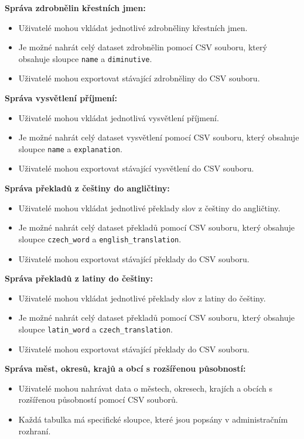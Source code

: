 \documentclass[czech, ba, kiv, he]{fasthesis}
\begin{document}
\textbf{Správa zdrobnělin křestních jmen:}
\begin{itemize}
    \item Uživatelé mohou vkládat jednotlivé zdrobněliny křestních jmen.
    \item Je možné nahrát celý dataset zdrobnělin pomocí CSV souboru, který obsahuje sloupce \texttt{name} a \texttt{diminutive}.
    \item Uživatelé mohou exportovat stávající zdrobněliny do CSV souboru.
\end{itemize}

\textbf{Správa vysvětlení příjmení:}
\begin{itemize}
    \item Uživatelé mohou vkládat jednotlivá vysvětlení příjmení.
    \item Je možné nahrát celý dataset vysvětlení pomocí CSV souboru, který obsahuje sloupce \texttt{name} a \texttt{explanation}.
    \item Uživatelé mohou exportovat stávající vysvětlení do CSV souboru.
\end{itemize}

\textbf{Správa překladů z češtiny do angličtiny:}
\begin{itemize}
    \item Uživatelé mohou vkládat jednotlivé překlady slov z češtiny do angličtiny.
    \item Je možné nahrát celý dataset překladů pomocí CSV souboru, který obsahuje sloupce \texttt{czech\_word} a \texttt{english\_translation}.
    \item Uživatelé mohou exportovat stávající překlady do CSV souboru.
\end{itemize}

\textbf{Správa překladů z latiny do češtiny:}
\begin{itemize}
    \item Uživatelé mohou vkládat jednotlivé překlady slov z latiny do češtiny.
    \item Je možné nahrát celý dataset překladů pomocí CSV souboru, který obsahuje sloupce \texttt{latin\_word} a \texttt{czech\_translation}.
    \item Uživatelé mohou exportovat stávající překlady do CSV souboru.
\end{itemize}

\textbf{Správa měst, okresů, krajů a obcí s rozšířenou působností:}
\begin{itemize}
    \item Uživatelé mohou nahrávat data o městech, okresech, krajích a obcích s rozšířenou působností pomocí CSV souborů.
    \item Každá tabulka má specifické sloupce, které jsou popsány v administračním rozhraní.
\end{itemize}
\end{document}
